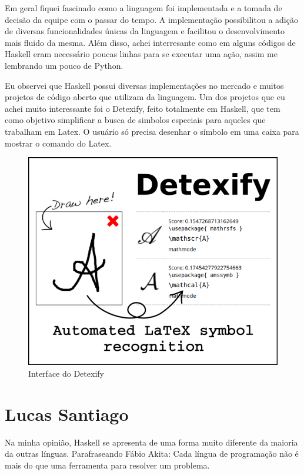 \documentclass[
  12pt,				         %
  oneside,			       %
  a4paper,			       %
  english,		       	 %
  brazil,			      	 %
]{abntex2}
\begin{document}
\begin{apendicesenv}
        Em geral fiquei fascinado como a linguagem foi implementada e a tomada de decisão da equipe com o passar do tempo. A implementação
        possibilitou a adição de diversas funcionalidades únicas da linguagem e facilitou o desenvolvimento mais fluido da mesma.
        Além disso, achei interresante como em alguns códigos de Haskell eram necessário poucas linhas para se executar uma ação, assim
        me lembrando um pouco de Python.

        Eu observei que Haskell possui diversas implementações no mercado e muitos projetos de código aberto que utilizam da linguagem.
        Um dos projetos que eu achei muito interessante foi o Detexify, feito totalmente em Haskell, que tem como objetivo simplificar a 
        busca de simbolos especiais para aqueles que trabalham em Latex. O usuário só precisa desenhar o símbolo em uma caixa para mostrar 
        o comando do Latex.
        
        \begin{figure}[ht]
          \centering
          \includegraphics[scale=0.8]{detexify.png}
          \caption{Interface do Detexify}
        \end{figure}

        \newpage 

        \chapter{Lucas Santiago}

        Na minha opinião, Haskell se apresenta de uma forma muito diferente da maioria da outras línguas. 
        Parafraseando Fábio Akita: Cada língua de programação não é mais do que uma ferramenta
        para resolver um problema.


\end{apendicesenv}
\end{document}
